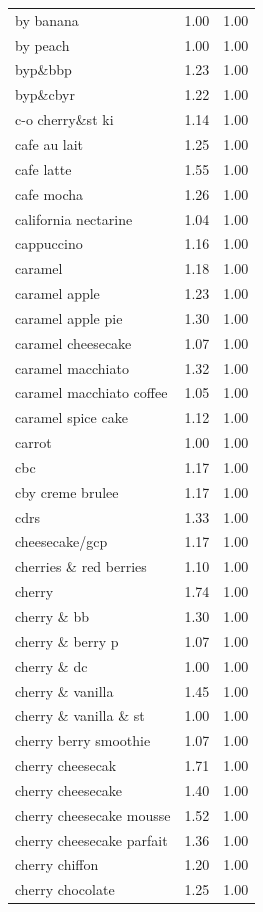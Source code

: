 \begin{table}
\begin{tabular}{lrr}
by banana & 1.00 & 1.00 \\
by peach & 1.00 & 1.00 \\
byp\&bbp & 1.23 & 1.00 \\
byp\&cbyr & 1.22 & 1.00 \\
c-o cherry\&st ki & 1.14 & 1.00 \\
cafe au lait & 1.25 & 1.00 \\
cafe latte & 1.55 & 1.00 \\
cafe mocha & 1.26 & 1.00 \\
california nectarine & 1.04 & 1.00 \\
cappuccino & 1.16 & 1.00 \\
caramel & 1.18 & 1.00 \\
caramel apple & 1.23 & 1.00 \\
caramel apple pie & 1.30 & 1.00 \\
caramel cheesecake & 1.07 & 1.00 \\
caramel macchiato & 1.32 & 1.00 \\
caramel macchiato coffee & 1.05 & 1.00 \\
caramel spice cake & 1.12 & 1.00 \\
carrot & 1.00 & 1.00 \\
cbc & 1.17 & 1.00 \\
cby creme brulee & 1.17 & 1.00 \\
cdrs & 1.33 & 1.00 \\
cheesecake/gcp & 1.17 & 1.00 \\
cherries \& red berries & 1.10 & 1.00 \\
cherry & 1.74 & 1.00 \\
cherry \& bb & 1.30 & 1.00 \\
cherry \& berry p & 1.07 & 1.00 \\
cherry \& dc & 1.00 & 1.00 \\
cherry \& vanilla & 1.45 & 1.00 \\
cherry \& vanilla \& st & 1.00 & 1.00 \\
cherry berry smoothie & 1.07 & 1.00 \\
cherry cheesecak & 1.71 & 1.00 \\
cherry cheesecake & 1.40 & 1.00 \\
cherry cheesecake mousse & 1.52 & 1.00 \\
cherry cheesecake parfait & 1.36 & 1.00 \\
cherry chiffon & 1.20 & 1.00 \\
cherry chocolate & 1.25 & 1.00 \\

\end{tabular}
\end{table}
